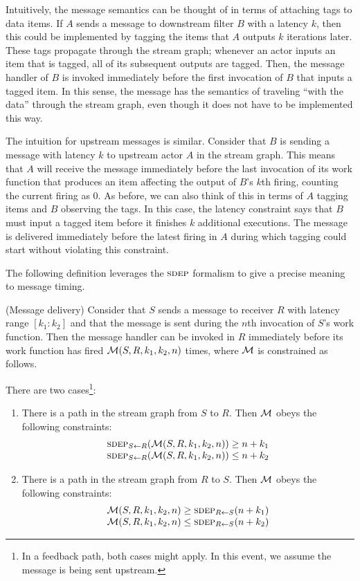 Intuitively, the message semantics can be thought of in terms of
attaching tags to data items.  If $A$ sends a message to downstream
filter $B$ with a latency $k$, then this could be implemented by
tagging the items that $A$ outputs $k$ iterations later.  These tags
propagate through the stream graph; whenever an actor inputs an item
that is tagged, all of its subsequent outputs are tagged.  Then, the
message handler of $B$ is invoked immediately before the first
invocation of $B$ that inputs a tagged item.  In this sense, the
message has the semantics of traveling ``with the data'' through the
stream graph, even though it does not have to be implemented this way.

The intuition for upstream messages is similar.  Consider that $B$ is
sending a message with latency $k$ to upstream actor $A$ in the stream
graph.  This means that $A$ will receive the message immediately
before the last invocation of its work function that produces an item
affecting the output of $B$'s $k$th firing, counting the current
firing as 0.  As before, we can also think of this in terms of $A$
tagging items and $B$ observing the tags.  In this case, the latency
constraint says that $B$ must input a tagged item before it finishes
$k$ additional executions.  The message is delivered immediately
before the latest firing in $A$ during which tagging could start
without violating this constraint.

The following definition leverages the $\textsc{sdep}$ formalism to give a
precise meaning to message timing.

\begin{definition}(Message delivery)
Consider that $S$ sends a message to receiver $R$ with latency range
$[k_1:k_2]$ and that the message is sent during the $n$th invocation
of $S$'s work function.  Then the message handler can be invoked in
$R$ immediately before its work function has fired ${\cal M}(S, R,
k_1, k_2, n)$ times, where ${\cal M}$ is constrained as follows.

There are two cases\footnote{In a feedback path, both cases might apply.  In this event, we assume the message is being sent upstream.}:
\begin{enumerate}

\item There is a path in the stream graph from $S$ to $R$.  Then
${\cal M}$ obeys the following constraints:
\[
\begin{array}{l}
\sdepf{S}{R}({\cal M}(S, R, k_1, k_2, n)) \ge n+k_1\\
\sdepf{S}{R}({\cal M}(S, R, k_1, k_2, n)) \le n+k_2
\end{array}
\]

\item There is a path in the stream graph from $R$ to $S$.  Then
${\cal M}$ obeys the following constraints:
\[
\begin{array}{l}
{\cal M}(S, R, k_1, k_2, n) \ge \sdepf{R}{S}(n + k_1)\\
{\cal M}(S, R, k_1, k_2, n) \le \sdepf{R}{S}(n + k_2)
\end{array}
\]
\end{enumerate}
\end{definition}

